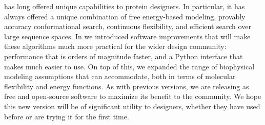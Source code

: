 \osprey has long offered unique capabilities to protein designers.  In particular, it has always offered a unique combination of free energy-based modeling, provably accuracy conformational search, continuous flexibility, and efficient search over large sequence spaces.  In  we introduced software improvements that will make these algorithms much more practical for the wider design community: performance that is orders of magnitude faster, and a Python interface that makes \osprey much easier to use.  On top of this, we expanded the range of biophysical modeling assumptions that \osprey can accommodate, both in terms of molecular flexibility and energy functions.  As with previous versions, we are releasing  as free and open-source software to maximize its benefit to the community.  We hope this new version will be of significant utility to designers, whether they have used \osprey before or are trying it for the first time.  

